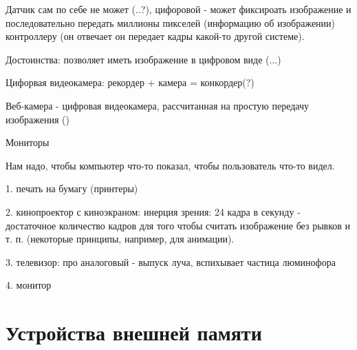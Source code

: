 Датчик сам по себе не может (..?), цифоровой - может фиксироать изображение и последовательно передать миллионы пикселей (информацию об изображении) контроллеру (он отвечает он передает кадры какой-то другой системе). 

Достоинства: позволяет иметь изображение в цифровом виде (...) 

Цифорвая видеокамера: рекордер + камера = конкордер(?)

Веб-камера - цифровая видеокамера, рассчитанная на простую передачу изображения ()

Мониторы

Нам надо, чтобы компьютер что-то показал, чтобы пользователь что-то видел.

1. печать на бумагу (принтеры)

2. кинопроектор с киноэкраном: инерция зрения: 24 кадра в секунду - достаточное количество кадров для того чтобы считать изображение без рывков и т. п. (некоторые принципы, например, для анимации).

3. телевизор: про аналоговый - выпуск луча, вспихывает частица люминофора

4. монитор
\section{Устройства внешней памяти}

